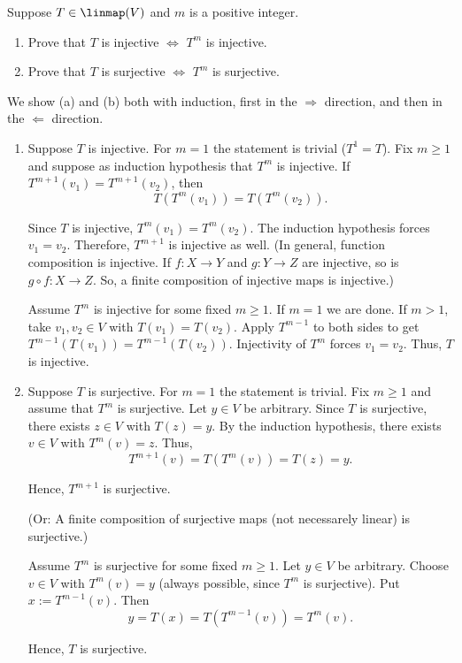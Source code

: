 \begin{xrcs}
  Suppose $T \in \linmap(V)$ and $m$ is a positive integer.
  \begin{enumerate}
    \item Prove that $T$ is injective $\iff$ $T^m$ is injective.
    \item Prove that $T$ is surjective $\iff$ $T^m$ is surjective.
  \end{enumerate}

  \begin{xprf}
    We show (a) and (b) both with induction, first in the $\Rightarrow$ direction, and then in the $\Leftarrow$ direction.
    \begin{enumerate}
      \item {
        \Rightarrowdirection Suppose $T$ is injective. For $m=1$ the statement is trivial ($T^1 = T$). Fix  $m \geq 1$ and suppose as induction hypothesis that $T^m$ is injective. If $T^{m+1}(v_1) = T^{m+1} (v_2)$, then
        \begin{equation}
          T(T^{m}(v_1)) = T(T^{m} (v_2)).
        \end{equation}

        Since $T$ is injective, $T^{m}(v_1) = T^{m} (v_2)$. The induction hypothesis forces $v_1 = v_2$. Therefore, $T^{m+1}$ is injective as well. (In general, function composition is injective. If $f: X \to Y$ and $g: Y \to Z$ are injective, so is $g \circ f : X \to Z$. So, a finite composition of injective maps is injective.)

        \Leftarrowdirection Assume $T^m$ is injective for some fixed $m \geq 1$. If $m=1$ we are done. If $m>1$, take $v_1, v_2 \in V$ with $T(v_1) = T(v_2)$. Apply $T^{m-1}$ to both sides to get $T^{m-1} (T(v_1)) = T^{m-1} (T(v_2))$. Injectivity of $T^{m}$ forces $v_1 = v_2$. Thus, $T$ is injective.
      }
      \item{
        \Rightarrowdirection Suppose $T$ is surjective. For $m=1$ the statement is trivial. Fix $m \geq 1$ and assume that $T^m$ is surjective. Let $y\in V$ be arbitrary. Since $T$ is surjective, there exists $z\in V$ with $T(z)=y$. By the induction hypothesis, there exists $v\in V$ with $T^m(v)=z$. Thus,
        \begin{equation}
          T^{m+1}(v)=T(T^m(v))=T(z)=y.
        \end{equation}

        Hence, $T^{m+1}$ is surjective.

        (Or: A finite composition of surjective maps (not necessarely linear) is surjective.)

        \Leftarrowdirection Assume $T^m$ is surjective for some fixed $m\ge 1$. Let $y\in V$ be arbitrary. Choose $v\in V$ with $T^m(v)=y$ (always possible, since $T^m$ is surjective). Put $x:=T^{m-1}(v)$. Then
        \begin{equation}
          y=T(x)=T(T^{m-1}(v))=T^m(v).
        \end{equation}

        Hence, $T$ is surjective.
      }
    \end{enumerate}
  \end{xprf}
\end{xrcs}

